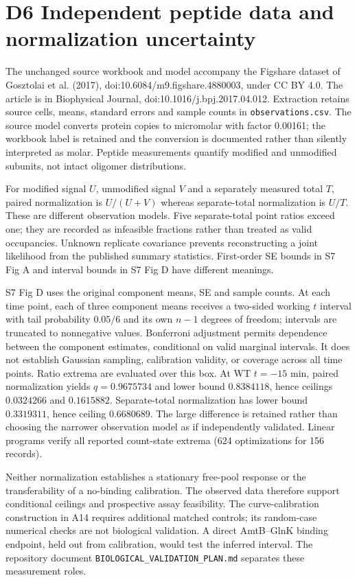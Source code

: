 \documentclass[11pt]{article}
\begin{document}
\section*{D6 Independent peptide data and normalization uncertainty}
The unchanged source workbook and model accompany the Figshare dataset of Gosztolai et al. (2017), doi:10.6084/m9.figshare.4880003, under CC BY 4.0. The article is in Biophysical Journal, doi:10.1016/j.bpj.2017.04.012. Extraction retains source cells, means, standard errors and sample counts in \texttt{observations.csv}. The source model converts protein copies to micromolar with factor 0.00161; the workbook label is retained and the conversion is documented rather than silently interpreted as molar. Peptide measurements quantify modified and unmodified subunits, not intact oligomer distributions.

For modified signal $U$, unmodified signal $V$ and a separately measured total $T$, paired normalization is $U/(U+V)$ whereas separate-total normalization is $U/T$. These are different observation models. Five separate-total point ratios exceed one; they are recorded as infeasible fractions rather than treated as valid occupancies. Unknown replicate covariance prevents reconstructing a joint likelihood from the published summary statistics. First-order SE bounds in S7 Fig A and interval bounds in S7 Fig D have different meanings.

S7 Fig D uses the original component means, SE and sample counts. At each time point, each of three component means receives a two-sided working $t$ interval with tail probability $0.05/6$ and its own $n-1$ degrees of freedom; intervals are truncated to nonnegative values. Bonferroni adjustment permits dependence between the component estimates, conditional on valid marginal intervals. It does not establish Gaussian sampling, calibration validity, or coverage across all time points. Ratio extrema are evaluated over this box. At WT $t=-15$ min, paired normalization yields $q=0.9675734$ and lower bound $0.8384118$, hence ceilings $0.0324266$ and $0.1615882$. Separate-total normalization has lower bound $0.3319311$, hence ceiling $0.6680689$. The large difference is retained rather than choosing the narrower observation model as if independently validated. Linear programs verify all reported count-state extrema (624 optimizations for 156 records).

Neither normalization establishes a stationary free-pool response or the transferability of a no-binding calibration. The observed data therefore support conditional ceilings and prospective assay feasibility. The curve-calibration construction in A14 requires additional matched controls; its random-case numerical checks are not biological validation. A direct AmtB--GlnK binding endpoint, held out from calibration, would test the inferred interval. The repository document \texttt{BIOLOGICAL\_VALIDATION\_PLAN.md} separates these measurement roles.
\end{document}
